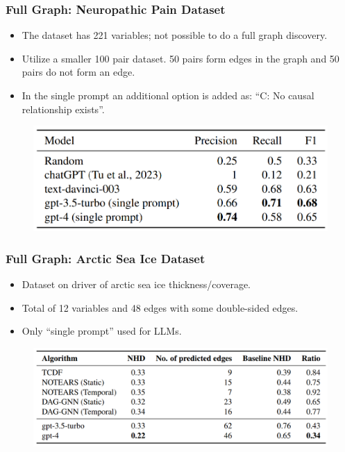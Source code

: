 \documentclass{beamer}
\begin{document}
\begin{frame}
	\frametitle{Full Graph: Neuropathic Pain Dataset}
	\begin{itemize}
		\item The dataset has 221 variables; not possible to do a full graph discovery.
		\item Utilize a smaller 100 pair dataset. 50 pairs form edges in the graph and 50 pairs do not form an edge.
		\item In the single prompt an additional option is added as: ``C: No causal relationship exists''.
	\end{itemize}
	\begin{figure}
		\includegraphics[scale=0.4]{imgs/table6.png}
	\end{figure}
\end{frame}

\begin{frame}
	\frametitle{Full Graph: Arctic Sea Ice Dataset}
	\begin{itemize}
		\item Dataset on driver of arctic sea ice thickness/coverage.
		\item Total of 12 variables and 48 edges with some double-sided edges.
		\item Only ``single prompt'' used for LLMs.
	\end{itemize}
	\begin{figure}
		\centering
		\includegraphics[scale=0.42]{imgs/table7.png}
	\end{figure}
\end{frame}
\end{document}
